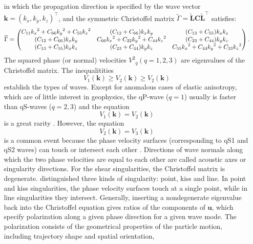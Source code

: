 in which the propagation direction is specified by the wave vector
$\mathbf{k}=(k_x,k_y,k_z)^{\top}$, 
and the symmetric Christoffel matrix $\widetilde{\Gamma} =
\widetilde{\mathbf{L}}\mathbf{C}\widetilde{\mathbf{L}}^{\top}$ satisfies:
\begin{equation}
\label{eq:gamma}
\widetilde{\Gamma} = 
 \begin{pmatrix} C_{11}{k_x}^2 + C_{66}{k_y}^2 + C_{55}{k_z}^2  &
 (C_{12}+C_{66}){k_x}{k_y}    &(C_{13}+C_{55}){k_x}{k_z} \cr
 (C_{12}+C_{66}){k_x}{k_y} & C_{66}{k_x}^2+C_{22}{k_y}^2+C_{44}{k_z}^2
 &(C_{23}+       C_{44}){k_y}{k_z} \cr
 (C_{13}+C_{55}){k_x}{k_z} & (C_{23}+C_{44}){k_y}{k_z} &
 C_{55}{k_x}^2+C_{44}{k_y}^2+  C_{33}{k_z}^2\end{pmatrix}.
\end{equation}
The squared phase (or normal) velocities ${V^2}_q (q=1,2,3)$ are eigenvalues of the 
Christoffel matrix. The inequalitities
\begin{equation}
\label{eq:v1v2v3}
{V_1(\mathbf{k})}\geq{V_2(\mathbf{k})}\geq{V_2(\mathbf{k})}
\end{equation}
establish the types of waves.
Except for anomalous cases of elastic anisotropy, which are of little interest in geophysics,
the qP-wave ($q=1$) usually is faster than qS-waves ($q=2,3$)
and the equation
\begin{equation}
\label{eq:v1v2}
{V_1(\mathbf{k})}={V_2(\mathbf{k})}
\end{equation}
is a great rarity \cite[]{yu:1993}. However, the equation
\begin{equation}
\label{eq:v2v3}
{V_2(\mathbf{k})}={V_3(\mathbf{k})}
\end{equation}
is a common event because the phase velocity surfaces (corresponding to qS1 and qS2 waves) can touch or intersect each other \cite[]{musgrave}.
Directions of wave normals along which the two phase velocities are equal to each other are called acoustic axes or singularity directions. 
For the shear singularities, the Christoffel matrix is degenerate.
\cite{crampin:1991} distinguished three kinds of singularity: point, kiss and line.
In point and kiss singularities, the phase velocity surfaces touch at a single point, while in line singularities                      
they intersect.
Generally, inserting a nondegenerate eigenvalue back into the Christoffel equation gives ratios of
the components of $\mathbf{u}$, 
which specify polarization along a given phase direction for a given wave mode.
The polarization consists of the geometrical properties of the particle motion, including trajectory shape and spatial orientation,
